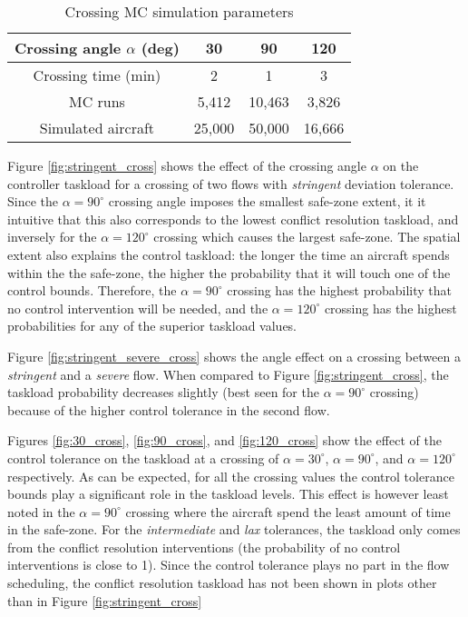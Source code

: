\documentclass[conference]{IEEEtran}
\begin{document}
\begin{table}
\caption{Crossing MC simulation parameters}
\label{tab:cross_MC}
\centering
\begin{tabular}{|c|c|c|c|}
\hline\hline
Crossing angle $\alpha$ (deg)&  30 & 90 & 120 \bigstrut\\ \hline
Crossing time (min) & 2 & 1 & 3 \bigstrut \\ \hline
MC runs& 5,412 &10,463 & 3,826\bigstrut \\ \hline
Simulated aircraft & 25,000 & 50,000 & 16,666 \bigstrut\\ \hline\hline
\end{tabular}
\end{table}


Figure \ref{fig:stringent_cross} shows the effect of the crossing angle $\alpha$ on the controller taskload for a crossing of two flows with \emph{stringent} deviation tolerance. Since the $\alpha=90^{\circ}$ crossing angle imposes the smallest safe-zone extent, it it intuitive that this also corresponds to the lowest conflict resolution taskload, and inversely for the $\alpha=120^{\circ}$ crossing which causes the largest safe-zone. The spatial extent also explains the control taskload: the longer the time an aircraft spends within the the safe-zone, the higher the probability that it will touch one of the control bounds. Therefore, the $\alpha=90^{\circ}$ crossing has the highest probability that no control intervention will be needed, and the $\alpha=120^{\circ}$ crossing has the highest probabilities for any of the superior taskload values.

Figure \ref{fig:stringent_severe_cross} shows the angle effect on a crossing between a \emph{stringent} and a \emph{severe} flow. When compared to Figure \ref{fig:stringent_cross}, the taskload probability decreases slightly (best seen for the $\alpha=90^{\circ}$ crossing)  because of the higher control tolerance in the second flow.

Figures \ref{fig:30_cross}, \ref{fig:90_cross}, and \ref{fig:120_cross} show the effect of the control tolerance on the taskload at a crossing of $\alpha=30^{\circ}$, $\alpha=90^{\circ}$, and $\alpha=120^{\circ}$ respectively. As can be expected, for all the crossing values the control tolerance bounds play a significant role in the taskload levels. This effect is however least noted in the $\alpha=90^{\circ}$ crossing where the aircraft spend the least amount of time in the safe-zone. For the \emph{intermediate} and \emph{lax} tolerances, the taskload only comes from the conflict resolution interventions (the probability of no control interventions is close to 1). Since the control tolerance plays no part in the flow scheduling, the conflict resolution taskload has not been shown in plots other than in Figure \ref{fig:stringent_cross} 
\end{document}
